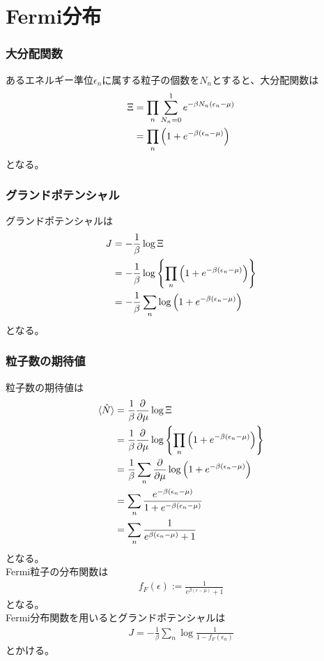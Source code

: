 \documentclass{jsarticle}  %
\numberwithin{equation}{section} %
\numberwithin{figure}{section}
\begin{document}
\section{Fermi分布}
\subsubsection{大分配関数}
    あるエネルギー準位$\epsilon_n$に属する粒子の個数を$N_n$とすると、大分配関数は
    \begin{align}
        \Xi &= \prod_n \sum_{N_n = 0}^{1} e^{-\beta N_n (\epsilon_n - \mu)} \notag \\
        &= \prod_n \left( 1 + e^{-\beta (\epsilon_n - \mu )} \right)
    \end{align}
    となる。
\subsubsection{グランドポテンシャル}
    グランドポテンシャルは
    \begin{align}
        J &= -\frac{1}{\beta} \log \Xi \notag \\
        &= -\frac{1}{\beta} \log \left\{ \prod_n \left( 1 + e^{-\beta (\epsilon_n - \mu )} \right) \right\} \notag \\
        &= -\frac{1}{\beta} \sum_n \log \left( 1 + e^{-\beta (\epsilon_n - \mu )} \right)
    \end{align}
    となる。
\subsubsection{粒子数の期待値}
    粒子数の期待値は
    \begin{align}
        \langle \hat{N} \rangle &= \frac{1}{\beta} \frac{\partial}{\partial \mu} \log \Xi \notag \\
        &= \frac{1}{\beta} \frac{\partial}{\partial \mu} \log \left\{ \prod_n \left( 1 + e^{-\beta (\epsilon_n - \mu )} \right) \right\} \notag \\
        &= \frac{1}{\beta} \sum_n \frac{\partial}{\partial \mu} \log \left( 1 + e^{-\beta (\epsilon_n - \mu )} \right) \notag \\
        &= \sum_n \frac{e^{-\beta (\epsilon_n - \mu )}}{1 + e^{-\beta (\epsilon_n - \mu )}} \notag \\
        &= \sum_n \frac{1}{e^{\beta (\epsilon_n - \mu)} + 1}
    \end{align}
    となる。\\
    Fermi粒子の分布関数は
    \begin{align}
        f_F (\epsilon) := \frac{1}{e^{\beta (\epsilon - \mu)} + 1}
    \end{align}
    となる。\\
    Fermi分布関数を用いるとグランドポテンシャルは
    \begin{align}
        J = -\frac{1}{\beta} \sum_n \log \frac{1}{1 - f_F (\epsilon_n)}
    \end{align}
    とかける。
\end{document}
